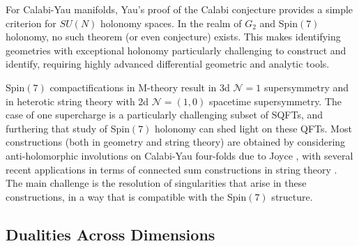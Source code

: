 \documentclass[12pt]{article}
\begin{document}
 For  Calabi-Yau manifolds, Yau's proof of the Calabi conjecture provides a simple criterion for $SU(N)$ holonomy spaces. 
 In the realm of $G_2$ and Spin$(7)$ holonomy, no such theorem (or even conjecture) exists.  This makes identifying geometries with exceptional holonomy 
 particularly challenging to construct and identify, requiring highly advanced differential geometric and analytic tools. 
 
 Spin$(7)$ compactifications in M-theory result in 3d $\mathcal{N}=1$ supersymmetry and in heterotic string theory with 2d $\mathcal{N}= (1,0)$ spacetime supersymmetry. The case of one supercharge is a particularly challenging subset of SQFTs, and furthering that study of Spin$(7)$ holonomy can shed light on these QFTs. Most constructions (both in geometry and string theory) are obtained by considering anti-holomorphic involutions on Calabi-Yau four-folds due to Joyce \cite{Joyce:1999nk}, with several recent applications in terms of connected sum constructions in string theory \cite{Braun:2018joh, Cvetic:2021maf}. The main challenge is the resolution of singularities that arise in these constructions, in a  way that is compatible with the Spin$(7)$ structure. 
 
 
 
 


\subsection{Dualities Across Dimensions}
\label{sec:DimRedux}
\end{document}
